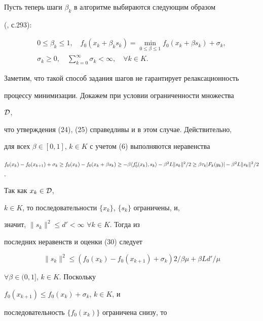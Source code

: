 Пусть теперь шаги $\beta_k$ в алгоритме выбираются следующим образом


(\cite{Vas}, с.293):


\begin{gather*}


0\le\beta_k\le 1,\quad f_0(x_k+\beta_ks_k)=


\min_{0\le\beta\le 1}f_0(x_k+\beta s_k)+\sigma_k,\\


\sigma_k\ge 0,\quad \sum^\infty_{k=0}\sigma_k<\infty,\quad


\forall k\in K.


\end{gather*}





Заметим, что такой способ задания шагов не гарантирует релаксационность


процессу минимизации. Докажем при условии ограниченности множества


$\cal D$,


что утверждения (24), (25) справедливы и в этом случае. Действительно,


для всех $\beta\in[0,1]$, $k\in K$ с учетом (6) выполняются неравенства


$f_0(x_k)-f_0(x_{k+1})+\sigma_k\ge f_0(x_k)-f_0(x_k+\beta s_k)\ge


-\beta\la f'_0(x_k),s_k\ra-\beta^2 L\|s_k\|^2/2\ge\beta\tau_k


|F_k(y_k)|-\beta^2 L\|s_k\|^2/2$.


Так как $x_k\in\cal D$,


$k\in K$, то последовательности $\{x_k\}$, $\{s_k\}$ ограничены, и,


значит, $\|s_k\|^2\le d'<\infty$ $\forall k\in K$. Тогда из


последних неравенств и оценки (30) следует


\begin{equation}


\|s_k\|^2\le(f_0(x_k)-f_0(x_{k+1})+\sigma_k)2/\beta\mu+


\beta Ld'/\mu


\end{equation}


$\forall\beta\in(0,1]$, $k\in K$. Поскольку


$f_0(x_{k+1})\le f_0(x_k)+\sigma_k$, $k\in K$, и


последовательность $\{f_0(x_k)\}$ ограничена снизу, то


